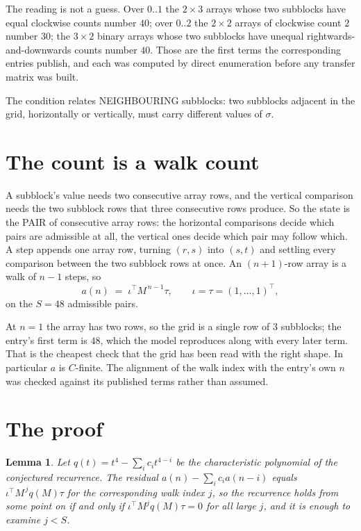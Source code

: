 \documentclass[11pt,a4paper]{article}
\theoremstyle{plain}
\newtheorem{lemma}[theorem]{Lemma}
\theoremstyle{definition}
\begin{document}
The reading is not a guess. Over $0..1$ the $2\times3$ arrays whose two subblocks have equal
clockwise counts number $40$; over $0..2$ the $2\times2$ arrays of clockwise count $2$ number
$30$; the $3\times2$ binary arrays whose two subblocks have unequal rightwards-and-downwards
counts number $40$. Those are the first terms the corresponding entries publish, and each was
computed by direct enumeration before any transfer matrix was built.

The condition relates NEIGHBOURING subblocks: two subblocks adjacent in the grid, horizontally
or vertically, must carry different values of $\sigma$.

\section{The count is a walk count}

A subblock's value needs two consecutive array rows, and the vertical
comparison needs the two subblock rows that three consecutive rows produce. So the state is the
PAIR of consecutive array rows: the horizontal comparisons decide which pairs are admissible at
all, the vertical ones decide which pair may follow which. A step appends one array row,
turning $(r,s)$ into $(s,t)$ and settling every comparison between the two subblock rows at
once. An $(n+1)$-row array is a walk of $n-1$ steps, so
\[
a(n)\;=\;\iota^{\!\top}M^{\,n-1}\tau,\qquad\iota=\tau=(1,\dots,1)^{\!\top},
\]
on the $S=48$ admissible pairs.

At $n=1$ the array has two rows, so the grid is a single row of $3$
subblocks; the entry's first term is $48$, which the model
reproduces along with every later term. That is the cheapest check that the grid has been read
with the right shape.
In particular $a$ is $C$-finite. The alignment of the walk index with the entry's own $n$ was
checked against its published terms rather than assumed.

\section{The proof}

\begin{lemma}\label{lem:crit}
Let $q(t)=t^{4}-\sum_i c_it^{4-i}$ be the characteristic polynomial of the
conjectured recurrence. The residual $a(n)-\sum_ic_ia(n-i)$ equals
$\iota^{\!\top}M^{\,j}q(M)\tau$ for the corresponding walk index $j$, so the recurrence
holds from some point on if and only if $\iota^{\!\top}M^{j}q(M)\tau=0$ for all large $j$,
and it is enough to examine $j<S$.
\end{lemma}
\end{document}
